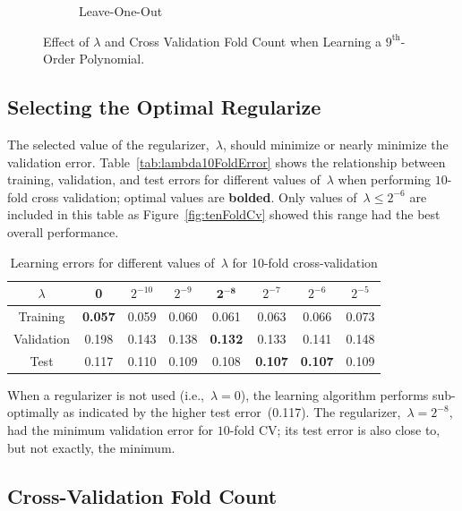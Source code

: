 \documentclass{report}
\begin{document}
\begin{figure}
\begin{subfigure}[t]{0.45\textwidth}
      \caption{Leave-One-Out}\label{fig:leaveOneOutCv}
    \end{subfigure}
    \caption{Effect of $\lambda$ and Cross Validation Fold Count when Learning a $9^{\text{th}}$-Order Polynomial.}\label{fig:effectLambda}
  \end{figure}


  \subsection{Selecting the Optimal Regularize}\label{sec:selectOptimalRegularizer}
  
  The selected value of the regularizer,~$\lambda$, should minimize or nearly minimize the validation error.  Table~\ref{tab:lambda10FoldError} shows the relationship between training, validation, and test errors for different values of~$\lambda$ when performing $10$-fold cross validation; optimal values are \textbf{bolded}.   Only values of~$\lambda \leq 2^{-6}$ are included in this table as Figure~\ref{fig:tenFoldCv} showed this range had the best overall performance.
  
  \begin{table}[b]
    \centering
    \caption{Learning errors for different values of~$\lambda$ for 10-fold cross-validation}\label{tab:lambda10FoldError}
    \label{my-label}
    \begin{tabular}{c||c|c|c|c|c|c|c}
      \hline
      $\lambda$  & 0     & $2^{-10}$ & $2^{-9}$ & $\mathbf{2^{-8}}$ & $2^{-7}$ & $2^{-6}$ & $2^{-5}$ \\ \hline\hline
      Training   & \textbf{0.057} & 0.059     & 0.060    & 0.061    & 0.063    & 0.066    & 0.073    \\ \hline
      Validation & 0.198 & 0.143     & 0.138    & \textbf{0.132}    & 0.133    & 0.141    & 0.148    \\ \hline
      Test       & 0.117 & 0.110     & 0.109    & 0.108    & \textbf{0.107}    & \textbf{0.107}    & 0.109    \\ \hline
    \end{tabular}
  \end{table}
  
  When a regularizer is not used (i.e.,~$\lambda=0$), the learning algorithm performs sub-optimally as indicated by the higher test error~(0.117). The regularizer,~$\lambda=2^{-8}$, had the minimum validation error for $10$-fold CV; its test error is also close to, but not exactly, the minimum.
  
  \subsection{Cross-Validation Fold Count}\label{sec:cvFoldCount}
  
\end{document}
